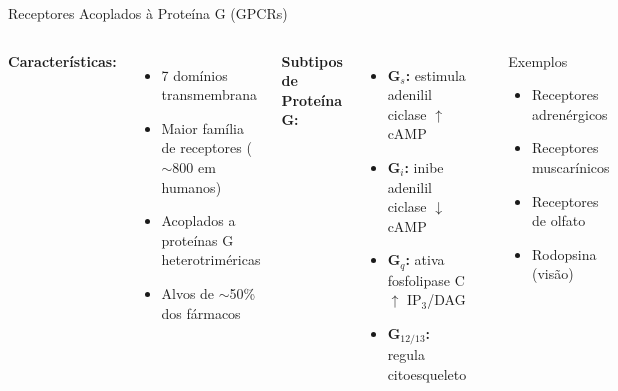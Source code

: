 \begin{frame}{Receptores Acoplados à Proteína G (GPCRs)}
\begin{columns}
\textbf{Características:}
\begin{itemize}
    \item 7 domínios transmembrana
    \item Maior família de receptores ($\sim$800 em humanos)
    \item Acoplados a proteínas G heterotriméricas
    \item Alvos de $\sim$50\% dos fármacos
\end{itemize}

\vspace{0.3cm}

\textbf{Subtipos de Proteína G:}
\begin{itemize}
    \item \textbf{G$_s$:} estimula adenilil ciclase $\uparrow$ cAMP
    \item \textbf{G$_i$:} inibe adenilil ciclase $\downarrow$ cAMP
    \item \textbf{G$_q$:} ativa fosfolipase C $\uparrow$ IP$_3$/DAG
    \item \textbf{G$_{12/13}$:} regula citoesqueleto
\end{itemize}

\begin{center}
\end{center}

\begin{exampleblock}{Exemplos}
\begin{itemize}
    \item Receptores adrenérgicos
    \item Receptores muscarínicos
    \item Receptores de olfato
    \item Rodopsina (visão)
\end{itemize}
\end{exampleblock}
\end{columns}
\end{frame}

